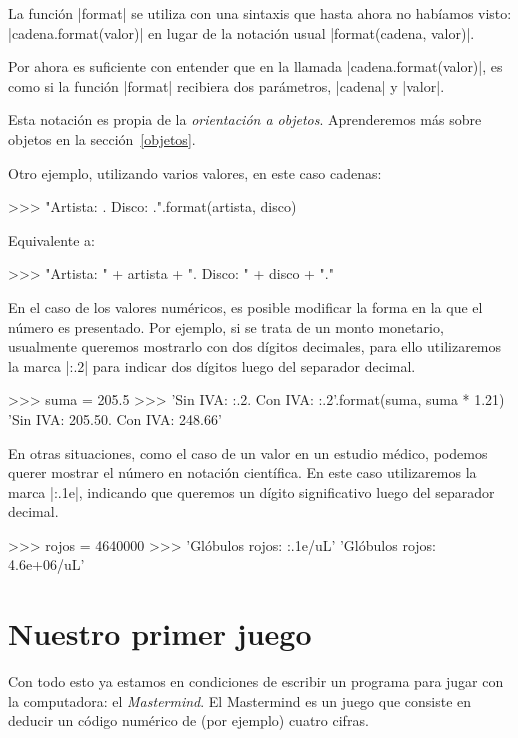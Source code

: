 \begin{sabias_que}
La función |format| se utiliza con una sintaxis que hasta ahora no habíamos
visto: |cadena.format(valor)| en lugar de la notación usual
|format(cadena, valor)|.

Por ahora es suficiente con entender que en la llamada |cadena.format(valor)|,
es como si la función |format| recibiera dos parámetros, |cadena| y |valor|.

Esta notación es propia de la \emph{orientación a objetos}. Aprenderemos más
sobre objetos en la sección~\ref{objetos}.
\end{sabias_que}

Otro ejemplo, utilizando varios valores, en este caso cadenas:
\begin{codigo-python-sn}
>>> "Artista: {}. Disco: {}.".format(artista, disco)
\end{codigo-python-sn}

Equivalente a:
\begin{codigo-python-sn}
>>> "Artista: " + artista + ". Disco: " + disco + "."
\end{codigo-python-sn}

En el caso de los valores numéricos, es posible modificar la forma en la que el
número es presentado. Por ejemplo, si se trata de un monto monetario, usualmente
queremos mostrarlo con dos dígitos decimales, para ello utilizaremos la
marca |{:.2}| para indicar dos dígitos luego del separador decimal.

\begin{codigo-python-sn}
>>> suma = 205.5
>>> 'Sin IVA: {:.2}. Con IVA: {:.2}'.format(suma, suma * 1.21)
'Sin IVA: 205.50. Con IVA: 248.66'
\end{codigo-python-sn}

En otras situaciones, como el caso de un valor en un estudio médico, podemos
querer mostrar el número en notación científica. En este caso utilizaremos la
marca |{:.1e}|, indicando que queremos un dígito significativo luego del separador
decimal.

\begin{codigo-python-sn}
>>> rojos = 4640000
>>> 'Glóbulos rojos: {:.1e}/uL'
'Glóbulos rojos: 4.6e+06/uL'
\end{codigo-python-sn}

\section{Nuestro primer juego}

Con todo esto ya estamos en condiciones de escribir un programa para jugar con
la computadora: el \emph{Mastermind}. El Mastermind es un juego que consiste en
deducir un código numérico de (por ejemplo) cuatro cifras.

